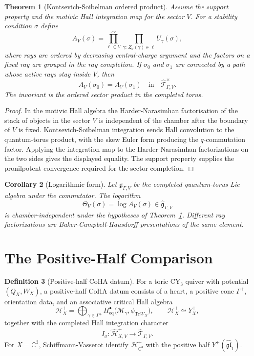 \documentclass[11pt]{article}
\newtheorem{theorem}{Theorem}
\newtheorem{corollary}[theorem]{Corollary}
\theoremstyle{definition}
\newtheorem{definition}[theorem]{Definition}
\providecommand{\C}{\mathbb{C}}
\providecommand{\cH}{\mathcal{H}}
\providecommand{\cM}{\mathcal{M}}
\providecommand{\cT}{\mathcal{T}}
\providecommand{\fg}{\mathfrak{g}}
\providecommand{\Yplus}{Y^{+}}
\begin{document}
\begin{theorem}[Kontsevich-Soibelman ordered product]
\label{thm:ks-sector-product}
Assume the support property and the motivic Hall integration map for the
sector $V$. For a stability condition $\sigma$ define
\[
 A_V(\sigma)
 =
 \prod_{\ell\subset V}^{\curvearrowright}
 \prod_{\gamma:\,Z_\sigma(\gamma)\in\ell}
 U_\gamma(\sigma),
\]
where rays are ordered by decreasing central-charge argument and the
factors on a fixed ray are grouped in the ray completion. If
$\sigma_0$ and $\sigma_1$ are connected by a path whose active rays stay
inside $V$, then
\[
 A_V(\sigma_0)=A_V(\sigma_1)
 \quad\text{in}\quad
 \widehat{\cT}_{\Gamma,V}^{\times}.
\]
The invariant is the ordered sector product in the completed torus.
\end{theorem}

\begin{proof}
In the motivic Hall algebra the Harder-Narasimhan factorisation of the
stack of objects in the sector $V$ is independent of the chamber after
the boundary of $V$ is fixed. Kontsevich-Soibelman integration sends
Hall convolution to the quantum-torus product, with the skew Euler form
producing the $q$-commutation factor. Applying the integration map to
the Harder-Narasimhan factorizations on the two sides gives the
displayed equality. The support property supplies the pronilpotent
convergence required for the sector completion.
\end{proof}

\begin{corollary}[Logarithmic form]
\label{cor:logarithmic-form}
Let $\fg_{\Gamma,V}$ be the completed quantum-torus Lie algebra under the
commutator. The logarithm
\[
 \Theta_V(\sigma)=\log A_V(\sigma)\in\widehat{\fg}_{\Gamma,V}
\]
is chamber-independent under the hypotheses of
Theorem~\ref{thm:ks-sector-product}. Different ray factorizations are
Baker-Campbell-Hausdorff presentations of the same element.
\end{corollary}

\section{The Positive-Half Comparison}

\begin{definition}[Positive-half CoHA datum]
For a toric CY$_3$ quiver with potential $(Q_X,W_X)$, a positive-half
CoHA datum consists of a heart, a positive cone $\Gamma^+$, orientation
data, and an associative critical Hall algebra
\[
 \cH_X^+
 =
 \bigoplus_{\gamma\in\Gamma^+}
 H^\bullet_{\mathrm{eq}}\bigl(\cM_\gamma,\phi_{\mathrm{Tr}W_X}\bigr),
 \qquad
 \cH_X^+\simeq \Yplus_X,
\]
together with the completed Hall integration character
\[
 I_\sigma:\widehat{\cH}_{X,V}^+\longrightarrow
 \widehat{\cT}_{\Gamma,V}.
\]
For $X=\C^3$, Schiffmann-Vasserot identify
$\cH_{\C^3}^+$ with the positive half
$\Yplus(\widehat{\mathfrak{gl}}_1)$.
\end{definition}
\end{document}
